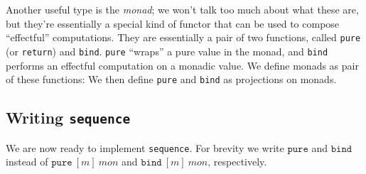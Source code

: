 \documentclass[10pt]{article}
\begin{document}
Another useful type is the \emph{monad}; we won't talk too much about what these are, but they're essentially a special kind of functor that can be used to compose ``effectful'' computations.
They are essentially a pair of two functions, called \texttt{pure} (or \texttt{return}) and \texttt{bind}.
\texttt{pure} ``wraps'' a pure value in the monad, and \texttt{bind} performs an effectful computation on a monadic value.
We define monads as pair of these functions:
We then define \texttt{pure} and \texttt{bind} as projections on monads.

\subsection{Writing \texttt{sequence}}

We are now ready to implement \texttt{sequence}.
For brevity we write $\texttt{pure}$ and $\texttt{bind}$ instead of $\texttt{pure}~ [m] ~ mon$ and $\texttt{bind}~[m]~mon$, respectively.
\end{document}
